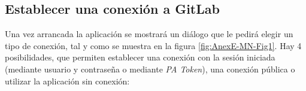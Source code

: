 \subsection{Establecer una conexión a GitLab}
Una vez arrancada la aplicación se mostrará un diálogo que le pedirá elegir un tipo de conexión, tal y como se muestra en la figura \ref{fig:AnexE-MN-Fig1}.
Hay 4 posibilidades, que permiten establecer una conexión con la sesión iniciada (mediante usuario y contraseña o mediante \textit{PA Token}), una conexión pública o utilizar la aplicación sin conexión:
